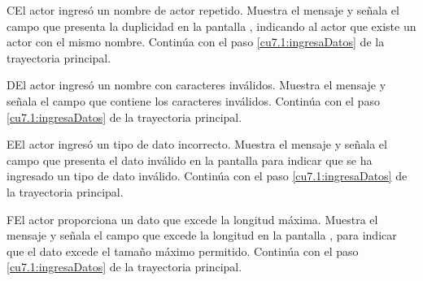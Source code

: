  \begin{UCtrayectoriaA}{C}{El actor ingresó un nombre de actor repetido.}
    \UCpaso[\UCsist] Muestra el mensaje  y señala el campo que presenta la duplicidad en la pantalla 
	    , indicando al actor que existe un actor con el mismo nombre.
    \UCpaso[] Continúa con el paso \ref{cu7.1:ingresaDatos} de la trayectoria principal.
 \end{UCtrayectoriaA}
 \begin{UCtrayectoriaA}{D}{El actor ingresó un nombre con caracteres inválidos.}
    \UCpaso[\UCsist] Muestra el mensaje  y señala el campo que contiene los caracteres inválidos.
    \UCpaso[] Continúa con el paso \ref{cu7.1:ingresaDatos} de la trayectoria principal.
 \end{UCtrayectoriaA}
 \begin{UCtrayectoriaA}{E}{El actor ingresó un tipo de dato incorrecto.}
    \UCpaso[\UCsist] Muestra el mensaje  y señala el campo que presenta el dato inválido en la 
    pantalla  para indicar que se ha ingresado un tipo de dato inválido.
    \UCpaso[] Continúa con el paso \ref{cu7.1:ingresaDatos} de la trayectoria principal.
 \end{UCtrayectoriaA}
 \begin{UCtrayectoriaA}{F}{El actor proporciona un dato que excede la longitud máxima.}
    \UCpaso[\UCsist] Muestra el mensaje  y señala el campo que excede la 
    longitud en la pantalla , para indicar que el dato excede el tamaño máximo permitido.
    \UCpaso[] Continúa con el paso \ref{cu7.1:ingresaDatos} de la trayectoria principal.
 \end{UCtrayectoriaA}
 